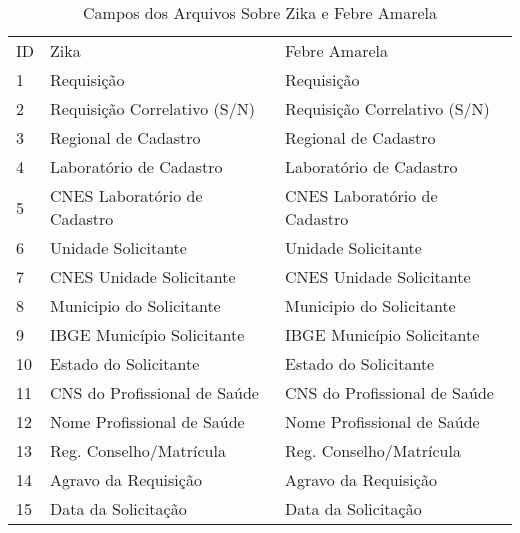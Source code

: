 \begin{table}
\centering
\caption{Campos dos Arquivos Sobre Zika e Febre Amarela}
\label{tab1}
\begin{tabular}{lll}
\rowcolor[rgb]{0.502,0.502,0.502} ID & Zika                             & Febre Amarela                     \\
\rowcolor[rgb]{0.753,0.753,0.753} 1  & Requisição                       & Requisição                        \\
2                                    & Requisição Correlativo (S/N)     & Requisição Correlativo (S/N)      \\
3                                    & Regional de Cadastro             & Regional de Cadastro              \\
4                                    & Laboratório de Cadastro          & Laboratório de Cadastro           \\
5                                    & CNES Laboratório de Cadastro     & CNES Laboratório de Cadastro      \\
6                                    & Unidade Solicitante              & Unidade Solicitante               \\
7                                    & CNES Unidade Solicitante         & CNES Unidade Solicitante          \\
8                                    & Municipio do Solicitante         & Municipio do Solicitante          \\
9                                    & IBGE Município Solicitante       & IBGE Município Solicitante        \\
10                                   & Estado do Solicitante            & Estado do Solicitante             \\
11                                   & CNS do Profissional de Saúde     & CNS do Profissional de Saúde      \\
12                                   & Nome Profissional de Saúde       & Nome Profissional de Saúde        \\
13                                   & Reg. Conselho/Matrícula          & Reg. Conselho/Matrícula           \\
14                                   & Agravo da Requisição             & Agravo da Requisição              \\
15                                   & Data da Solicitação              & Data da Solicitação               \\

\end{tabular}
\end{table}
